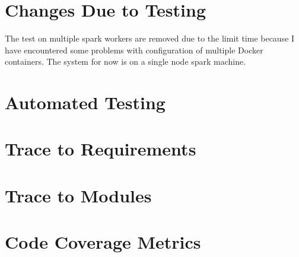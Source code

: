 \documentclass[12pt, titlepage]{article}
\begin{document}
\section{Changes Due to Testing}
The test on multiple spark workers are removed due to the limit time because  I have encountered some problems with configuration of multiple Docker containers. The system for now is on a single node spark machine.
\section{Automated Testing}
		
\section{Trace to Requirements}
		
\section{Trace to Modules}		

\section{Code Coverage Metrics}




\end{document}
